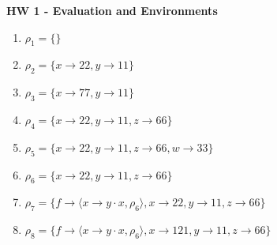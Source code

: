 \documentclass[a4paper, 12pt]{article}
\begin{document}
	\begin{center}
		\textbf{HW 1 - Evaluation and Environments}
	\end{center}

	\begin{enumerate}
		\item $\rho_1 = \{\}$
		\item $\rho_2 = \{x\rightarrow 22, y\rightarrow 11\}$
		\item $\rho_3 = \{x\rightarrow 77, y\rightarrow 11\}$
		\item $\rho_4 = \{x\rightarrow 22, y\rightarrow 11, z\rightarrow 66\}$
		\item $\rho_5 = \{x\rightarrow 22, y\rightarrow 11, z\rightarrow 66, w\rightarrow 33\}$
		\item $\rho_6 = \{x\rightarrow 22, y\rightarrow 11, z\rightarrow 66\}$
		\item $\rho_7 = \{f \rightarrow \langle x\rightarrow y\cdot x, \rho_6\rangle, x\rightarrow 22, y\rightarrow 11, z\rightarrow 66\}$
		\item $\rho_8 = \{f \rightarrow \langle x\rightarrow y\cdot x, \rho_6\rangle, x\rightarrow 121, y\rightarrow 11, z\rightarrow 66\}$
	\end{enumerate}
\end{document}
